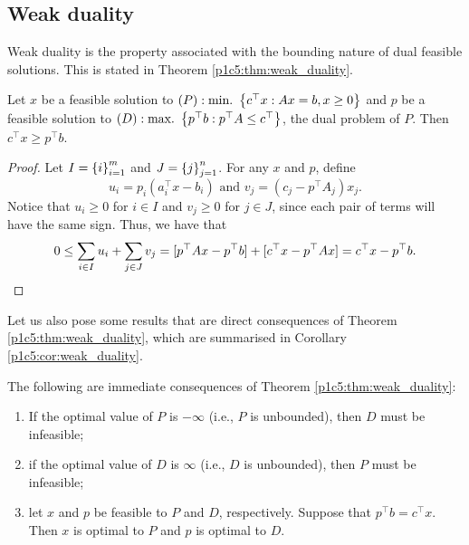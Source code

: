 \subsection{Weak duality}

Weak duality is the property associated with the bounding nature of dual feasible solutions. This is stated in Theorem \ref{p1c5:thm:weak_duality}.

\begin{theorem} \label{p1c5:thm:weak_duality}
		Let $x$ be a feasible solution to $(P) : \mathop{\text{min.~}}\left\{ c^\top x : Ax = b, x \geq 0 \right \}$ and $p$ be a feasible solution to $(D) : \mathop{\text{max.~}}\left\{ p^\top b : p^\top A \leq c^\top \right \}$, the dual problem of $P$. Then $c^\top x \geq p^\top b$.
\end{theorem}

\begin{proof}
	Let $I = \left\{ i \right \}_{i=1}^m$ and $J = \left\{ j \right \}_{j=1}^n$. For any $x$ and $p$, define
%
	  	\begin{equation*}
			u_i = p_i (a_i^\top x - b_i) \text{ and }
			v_j = (c_j - p^\top A_j)x_j.	
		\end{equation*}
%
	Notice that $u_i \geq 0$ for $i \in I$ and $v_j \geq 0$ for $j \in J$, since each pair of terms will have the same sign. Thus, we have that
%
	\begin{equation*}
		0 \leq \sum_{i \in I} u_i + \sum_{j \in J} v_j = [p^\top Ax - p^\top b] + [c^\top x - p^\top Ax] = c^\top x - p^\top b. \qedhere
	\end{equation*}
%
\end{proof}

Let us also pose some results that are direct consequences of Theorem \ref{p1c5:thm:weak_duality}, which are summarised in Corollary \ref{p1c5:cor:weak_duality}.

\begin{corollary}\label{p1c5:cor:weak_duality}
	The following are immediate consequences of Theorem \ref{p1c5:thm:weak_duality}:
	\begin{enumerate}
		\item If the optimal value of $P$ is $-\infty$ (i.e., $P$ is unbounded), then $D$ must be infeasible;
		\item if the optimal value of $D$ is $\infty$ (i.e., $D$ is unbounded), then $P$ must be infeasible;
		\item let $x$ and $p$ be feasible to $P$ and $D$, respectively. Suppose that $p^\top b = c^\top x$. Then $x$ is optimal to $P$ and $p$ is optimal to $D$.
	\end{enumerate}
\end{corollary}


